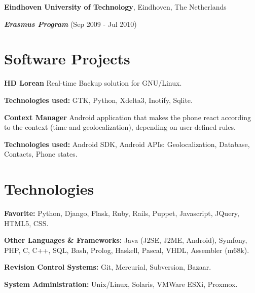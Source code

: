 \documentclass[margin,line]{resume}
\begin{document}
\begin{resume}
{\bf Eindhoven University of Technology}, Eindhoven, The Netherlands\\
\vspace*{-.1in}
\begin{list1}
\item[] {\bf \em Erasmus Program} (Sep 2009 - Jul 2010) 
\end{list1}

\vspace{+.2in}
\section{\sc Software Projects } 
\begin{list1}
\item[] {\bf HD Lorean}
Real-time Backup solution for GNU/Linux.
\vspace*{.05in}
\begin{list2}
\item {\bf Technologies used:} GTK, Python, Xdelta3, Inotify, Sqlite.\\
\end{list2} 

\item[] {\bf Context Manager}
Android application that makes the phone react according to the context 
(time and geolocalization), depending on user-defined rules.
\vspace*{+.03in}
\begin{list2}
\item {\bf Technologies used:} Android SDK, Android APIs: Geolocalization, 
Database, Contacts, Phone states.
\end{list2}
\end{list1}

\vspace{+.2in}
\section{\sc Technologies} 
\begin{list1}
\item[]{\bf Favorite:}  Python, Django, Flask, Ruby, Rails, Puppet, Javascript, JQuery, HTML5, CSS. 
\item[]{\bf Other Languages \& Frameworks:} Java (J2SE, J2ME, Android), Symfony, PHP, C, C++, SQL, Bash, Prolog, Haskell, Pascal, VHDL, Assembler (m68k).
\item[]{\bf Revision Control Systems:} Git, Mercurial, Subversion, Bazaar.
\item[]{\bf System Administration:} Unix/Linux, Solaris, VMWare ESXi, Proxmox.
\end{list1}


\end{resume}
\end{document}
